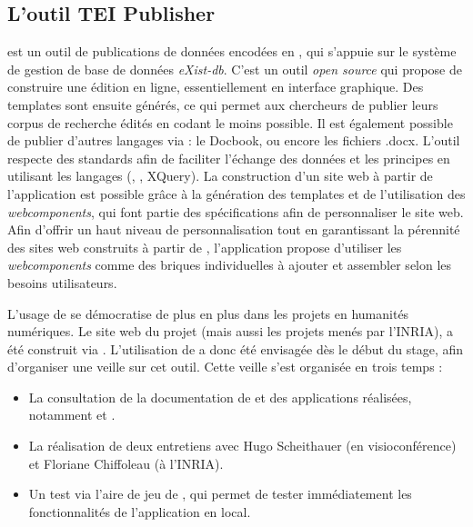     \subsection{L’outil TEI Publisher}
\tp est un outil de publications de données encodées en \TEI, qui s'appuie sur le système de gestion de base de données \XML \textit{eXist-db}. C'est un outil \textit{open source} qui propose de construire une édition en ligne, essentiellement en interface graphique. Des templates \HTML sont ensuite générés, ce qui permet aux chercheurs de publier leurs corpus de recherche édités en codant le moins possible. Il est également possible de publier d'autres langages via  \tp : le \XML Docbook, \JATS ou encore les fichiers .docx. L'outil \tp respecte des standards afin de faciliter l'échange des données et les principes \fair en utilisant les langages \XML (\TEI, \ODD, XQuery). La construction d'un site web à partir de l'application \tp est possible grâce à la génération des templates \HTML et de l'utilisation des \textit{webcomponents}, qui font partie des spécifications  afin de personnaliser le site web. Afin d'offrir un haut niveau de personnalisation tout en garantissant la pérennité des sites web construits à partir de \tp, l'application propose d'utiliser les \textit{webcomponents} comme des briques individuelles à ajouter et assembler selon les besoins utilisateurs. 

L'usage de \tp se démocratise de plus en plus dans les projets en humanités numériques. Le site web du projet \cordel (mais aussi les projets menés par l'INRIA), a été construit via \tp. L'utilisation de \tp a donc été envisagée dès le début du stage, afin d'organiser une veille sur cet outil. Cette veille s'est organisée en trois temps : 

\begin{itemize}
    \item La consultation de la documentation de \tp et des applications réalisées, notamment \cordel et \disco. 
    \item La réalisation de deux entretiens avec Hugo Scheithauer (en visioconférence) et Floriane Chiffoleau (à l'INRIA). 
    \item Un test via l'\og aire de jeu \fg de \tp, qui permet de tester immédiatement les fonctionnalités de l'application en local. 
\end{itemize}

